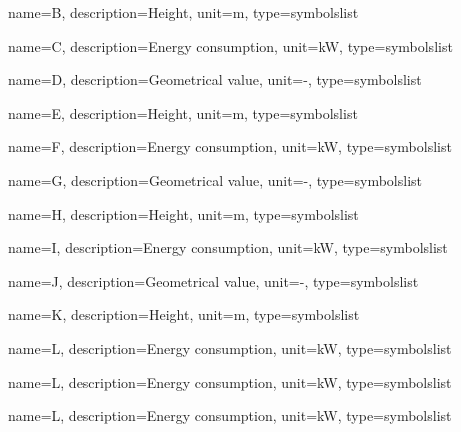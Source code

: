 {
    name=B,
    description={Height},
    unit={\si{m}},
    type=symbolslist
}

 {
    name=C,
    description={Energy consumption},
    unit={\si{kW}},
    type={symbolslist}
}

 {
    name=D,
    description=Geometrical value,
    unit=-,
    type=symbolslist
}

 {
    name=E,
    description={Height},
    unit={\si{m}},
    type=symbolslist
}

 {
    name=F,
    description={Energy consumption},
    unit={\si{kW}},
    type={symbolslist}
}


 {
    name=G,
    description=Geometrical value,
    unit=-,
    type=symbolslist
}

 {
    name=H,
    description={Height},
    unit={\si{m}},
    type=symbolslist
}

 {
    name=I,
    description={Energy consumption},
    unit={\si{kW}},
    type={symbolslist}
}

 {
    name=J,
    description=Geometrical value,
    unit=-,
    type=symbolslist
}

 {
    name=K,
    description={Height},
    unit={\si{m}},
    type=symbolslist
}

 {
    name=L,
    description={Energy consumption},
    unit={\si{kW}},
    type={symbolslist}
}

 {
    name=L,
    description={Energy consumption},
    unit={\si{kW}},
    type={symbolslist}
}

 {
    name=L,
    description={Energy consumption},
    unit={\si{kW}},
    type={symbolslist}
}


\newcommand{\acroX}[2]{\newacronym{#1}{#1}{#2}}

\newcommand{\acroY}[3]{\newacronym{#1}{#2}{#3}}
 
